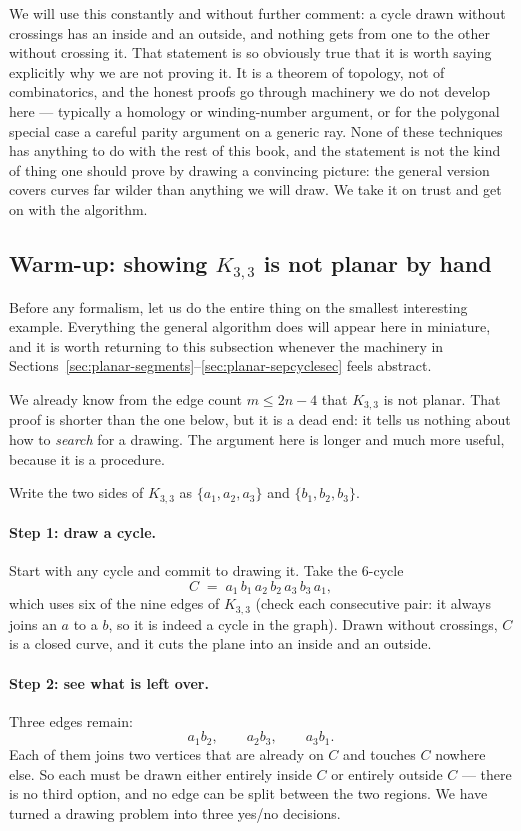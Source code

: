 We will use this constantly and without further comment: a cycle drawn without
crossings has an inside and an outside, and nothing gets from one to the other
without crossing it. That statement is so obviously true that it is worth
saying explicitly why we are not proving it. It is a theorem of topology, not
of combinatorics, and the honest proofs go through machinery we do not develop
here --- typically a homology or winding-number argument, or for the
polygonal special case a careful parity argument on a generic ray. None of
these techniques has anything to do with the rest of this book, and the
statement is not the kind of thing one should prove by drawing a convincing
picture: the general version covers curves far wilder than anything we will
draw. We take it on trust and get on with the algorithm.

\subsection{Warm-up: showing \texorpdfstring{$K_{3,3}$}{K33} is not planar by
hand}\label{sec:planar-k33warmup}

Before any formalism, let us do the entire thing on the smallest interesting
example. Everything the general algorithm does will appear here in miniature,
and it is worth returning to this subsection whenever the machinery in
Sections~\ref{sec:planar-segments}--\ref{sec:planar-sepcyclesec} feels abstract.

We already know from the edge count $m \le 2n-4$ that $K_{3,3}$ is not planar.
That proof is shorter than the one below, but it is a dead end: it tells us
nothing about how to \emph{search} for a drawing. The argument here is longer
and much more useful, because it is a procedure.

Write the two sides of $K_{3,3}$ as $\{a_1,a_2,a_3\}$ and $\{b_1,b_2,b_3\}$.

\paragraph{Step 1: draw a cycle.}
Start with any cycle and commit to drawing it. Take the $6$-cycle
\[
  C \;=\; a_1 \, b_1 \, a_2 \, b_2 \, a_3 \, b_3 \, a_1 ,
\]
which uses six of the nine edges of $K_{3,3}$ (check each consecutive pair: it
always joins an $a$ to a $b$, so it is indeed a cycle in the graph). Drawn
without crossings, $C$ is a closed curve, and it cuts the plane into an inside
and an outside.

\paragraph{Step 2: see what is left over.}
Three edges remain:
\[
  a_1b_2, \qquad a_2b_3, \qquad a_3b_1 .
\]
Each of them joins two vertices that are already on $C$ and touches $C$ nowhere
else. So each must be drawn either entirely inside $C$ or entirely outside
$C$ --- there is no third option, and no edge can be split between the two
regions. We have turned a drawing problem into three yes/no decisions.

